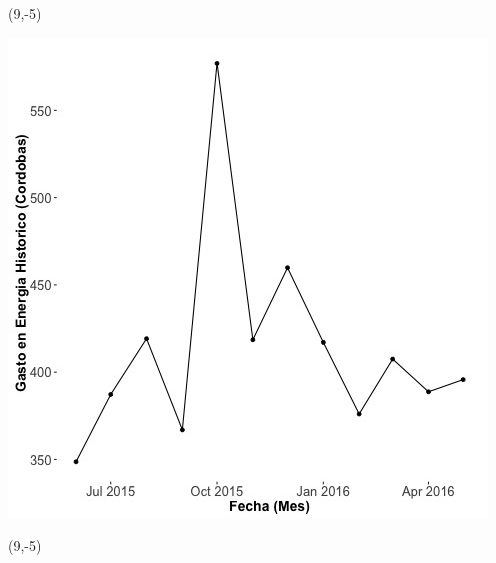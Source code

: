 \documentclass{article}\usepackage[]{graphicx}\usepackage[]{color}
\newenvironment{knitrout}{}{} %
\begin{document}
 \begin{textblock}{1}(9,-5)
\begin{minipage}{20em}
\begingroup

\endgroup
\end{minipage}
\end{textblock}

\begin{knitrout}
\color{fgcolor}
\includegraphics[scale=0.65]{figure/A14_historico_cordobas} 
\end{knitrout}

 \begin{textblock}{1}(9,-5)
\begin{minipage}{20em}
\begingroup

\endgroup
\end{minipage}
\end{textblock}
\end{document}
